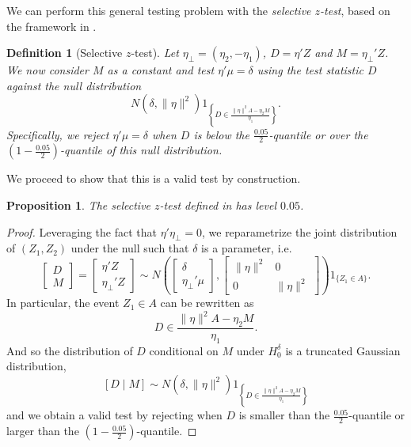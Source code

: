 \documentclass[aoas, preprint]{imsart}
\newtheorem{definition}{Definition}
\newtheorem{proposition}[corollary]{Proposition}
\theoremstyle{definition}
\theoremstyle{custom}
\begin{document}
  We can perform this general testing problem with the {\em selective $z$-test}, based on the framework in \citet{Lee:2016fv}.

  \begin{definition}[Selective $z$-test]
  \label{def:sel-gauss}
    Let $\eta_\perp = (\eta_2, -\eta_1)$, $D = \eta' Z$ and $M = \eta_\perp' Z$. We now consider $M$ as a constant and test $\eta' \mu = \delta$ using the test statistic $D$ against the null distribution
    \[
      N(\delta, \|\eta\|^2) 1_{\left\{D \in \frac{\|\eta\|^2 A - \eta_2 M}{\eta_1}\right\}}.
    \]
    Specifically, we reject $\eta' \mu = \delta$ when $D$ is below the $\frac{0.05}{2}$-quantile or over the $(1 - \frac{0.05}{2})$-quantile of this null distribution.
  \end{definition}

  We proceed to show that this is a valid test by construction.

  \begin{proposition}
  \label{prop:sel-gauss}
    The selective $z$-test defined in  has level $0.05$.
  \end{proposition}

  \begin{proof}
    Leveraging the fact that $\eta' \eta_\perp = 0$, we reparametrize the joint distribution of $(Z_1, Z_2)$ under the null such that $\delta$ is a parameter, i.e.
    \[
      \begin{bmatrix} D \\ M \end{bmatrix} =
      \begin{bmatrix} \eta' Z \\ \eta_\perp' Z \end{bmatrix}
      \sim N\left(
      \begin{bmatrix} \delta \\ \eta_\perp' \mu \end{bmatrix},
      \begin{bmatrix}
        \|\eta\|^2 & 0 \\
        0 & \|\eta\|^2
      \end{bmatrix}\right) 1_{\{Z_1 \in A\}}.
    \]
    In particular, the event $Z_1 \in A$ can be rewritten as
    \[
      D \in \frac{\|\eta\|^2 A - \eta_2 M}{\eta_1}.
    \]
    And so the distribution of $D$ conditional on $M$ under $H_0^\delta$ is a truncated Gaussian distribution,
    \[
      [D \mid M] \sim N\left(\delta, \|\eta\|^2\right) 1_{\left\{D \in \frac{\|\eta\|^2 A - \eta_2 M}{\eta_1}\right\}}
    \]
    and we obtain a valid test by rejecting when $D$ is smaller than the $\frac{0.05}{2}$-quantile or larger than the $\left(1 - \frac{0.05}{2}\right)$-quantile.
  \end{proof}
\end{document}
